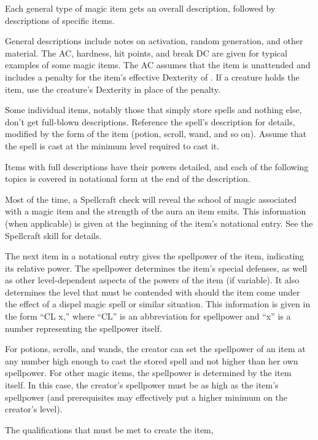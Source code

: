 Each general type of magic item gets an overall description, followed by descriptions of specific items.

General descriptions include notes on activation, random generation, and other material.
The AC, hardness, hit points, and break DC are given for typical examples of some magic items.
The AC assumes that the item is unattended and includes a  penalty for the item's effective Dexterity of .
If a creature holds the item, use the creature's Dexterity in place of the  penalty.

Some individual items, notably those that simply store spells and nothing else, don't get full-blown descriptions.
Reference the spell's description for details, modified by the form of the item (potion, scroll, wand, and so on).
Assume that the spell is cast at the minimum level required to cast it.

Items with full descriptions have their powers detailed, and each of the following topics is covered in notational form at the end of the description.

 Most of the time, a Spellcraft check will reveal the school of magic associated with a magic item and the strength of the aura an item emits.
This information (when applicable) is given at the beginning of the item's notational entry.
See the Spellcraft skill for details.

 The next item in a notational entry gives the spellpower of the item, indicating its relative power.
The spellpower determines the item's special defenses, as well as other level-dependent aspects of the powers of the item (if variable).
It also determines the level that must be contended with should the item come under the effect of a dispel magic spell or similar situation.
This information is given in the form ``CL x,'' where ``CL'' is an abbreviation for spellpower and ``x'' is a number representing the spellpower itself.

For potions, scrolls, and wands, the creator can set the spellpower of an item at any number high enough to cast the stored spell and not higher than her own spellpower.
For other magic items, the spellpower is determined by the item itself.
In this case, the creator's spellpower must be as high as the item's spellpower (and prerequisites may effectively put a higher minimum on the creator's level).

 The qualifications that must be met to create the item, %


